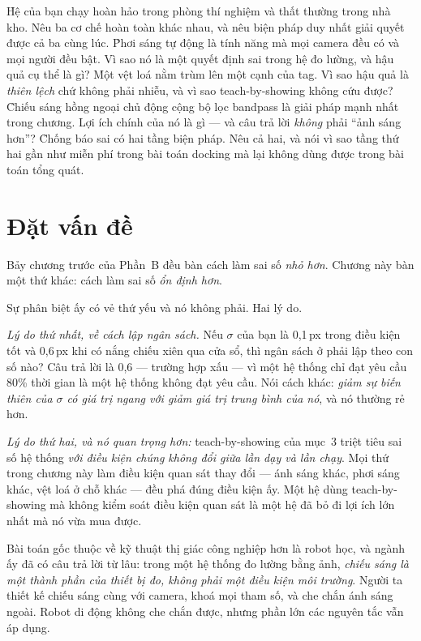 \documentclass[../../marker.tex]{subfiles}
\begin{document}
\begin{khoigoi}
\h{Hệ của bạn chạy hoàn hảo trong phòng thí nghiệm và thất thường trong nhà kho. Nêu ba cơ chế hoàn toàn khác nhau, và nêu biện pháp duy nhất giải quyết được cả ba cùng lúc.}
\h{Phơi sáng tự động là tính năng mà mọi camera đều có và mọi người đều bật. Vì sao nó là một quyết định sai trong hệ đo lường, và hậu quả cụ thể là gì?}
\h{Một vệt loá nằm trùm lên một cạnh của tag. Vì sao hậu quả là \emph{thiên lệch} chứ không phải nhiễu, và vì sao teach-by-showing không cứu được?}
\h{Chiếu sáng hồng ngoại chủ động cộng bộ lọc bandpass là giải pháp mạnh nhất trong chương. Lợi ích chính của nó là gì --- và câu trả lời \emph{không} phải ``ảnh sáng hơn''?}
\h{Chống báo sai có hai tầng biện pháp. Nêu cả hai, và nói vì sao tầng thứ hai gần như miễn phí trong bài toán docking mà lại không dùng được trong bài toán tổng quát.}
\end{khoigoi}

\section{Đặt vấn đề}

Bảy chương trước của Phần~B đều bàn cách làm sai số \emph{nhỏ hơn}. Chương này bàn một thứ khác: cách làm sai số \emph{ổn định hơn}.

Sự phân biệt ấy có vẻ thứ yếu và nó không phải. Hai lý do.

\emph{Lý do thứ nhất, về cách lập ngân sách.} Nếu \(\sigma\) của bạn là 0,1\,px trong điều kiện tốt và 0,6\,px khi có nắng chiếu xiên qua cửa sổ, thì ngân sách ở  phải lập theo con số nào? Câu trả lời là 0,6 --- trường hợp xấu --- vì một hệ thống chỉ đạt yêu cầu 80\% thời gian là một hệ thống không đạt yêu cầu. Nói cách khác: \emph{giảm sự biến thiên của \(\sigma\) có giá trị ngang với giảm giá trị trung bình của nó}, và nó thường rẻ hơn.

\emph{Lý do thứ hai, và nó quan trọng hơn:} teach-by-showing của  mục~3 triệt tiêu sai số hệ thống \emph{với điều kiện chúng không đổi giữa lần dạy và lần chạy}. Mọi thứ trong chương này làm điều kiện quan sát thay đổi --- ánh sáng khác, phơi sáng khác, vệt loá ở chỗ khác --- đều phá đúng điều kiện ấy. Một hệ dùng teach-by-showing mà không kiểm soát điều kiện quan sát là một hệ đã bỏ đi lợi ích lớn nhất mà nó vừa mua được.

Bài toán gốc thuộc về kỹ thuật thị giác công nghiệp hơn là robot học, và ngành ấy đã có câu trả lời từ lâu: trong một hệ thống đo lường bằng ảnh, \emph{chiếu sáng là một thành phần của thiết bị đo, không phải một điều kiện môi trường}. Người ta thiết kế chiếu sáng cùng với camera, khoá mọi tham số, và che chắn ánh sáng ngoài. Robot di động không che chắn được, nhưng phần lớn các nguyên tắc vẫn áp dụng.
\end{document}
